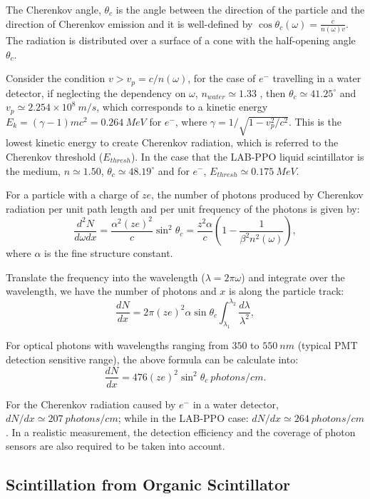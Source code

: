 The Cherenkov angle, $\theta_c$ is the angle between the direction of the particle and the direction of Cherenkov emission and it is well-defined by $\cos\theta_c(\omega) = \frac{c}{n(\omega)v}$. The radiation is distributed over a surface of a cone with the half-opening angle $\theta_c$. 

Consider the condition $v>v_p=c/n(\omega)$, for the case of $e^-$ travelling in a water detector, if neglecting the dependency on $\omega$, $n_{water}\simeq 1.33$ \cite{pdg2018}, then $\theta_c\simeq 41.25^\circ$ and $v_p\simeq 2.254\times10^8~m/s$, which corresponds to a kinetic energy $E_k=(\gamma-1)mc^2=0.264~MeV$ for $e^-$, where $\gamma=1/\sqrt{1-v_p^2/c^2}$. This is the lowest kinetic energy to create Cherenkov radiation, which is referred to the Cherenkov threshold ($E_{thresh}$). In the case that the LAB-PPO liquid scintillator is the medium, $n\simeq 1.50$\cite{tseung2011ellipsometric}, $\theta_c\simeq 48.19^\circ$ and for $e^-$, $E_{thresh}\simeq 0.175~MeV$.   

For a particle with a charge of $ze$, the number of photons produced by Cherenkov radiation per unit path length and per unit frequency of the photons is given by\cite{leo2012techniques}:
\[
\frac{d^2N}{d\omega dx}=\frac{\alpha^2 (ze)^2}{c}\sin^2\theta_c=\frac{z^2\alpha}{c}(1-\frac{1}{\beta^2 n^2(\omega)}),
\]
where $\alpha$ is the fine structure constant.

Translate the frequency into the wavelength ($\lambda=2\pi\omega$) and integrate over the wavelength, we have the number of photons and $x$ is along the particle track\cite{leo2012techniques}:
\[
\frac{dN}{dx}=2\pi (ze)^2\alpha\sin\theta_c\int_{\lambda_1}^{\lambda_2}\frac{d\lambda}{\lambda^2},
\]

For optical photons with wavelengths ranging from $350$ to $550~nm$ (typical PMT detection sensitive range), the above formula can be calculate into\cite{leo2012techniques}:
\[
\frac{dN}{dx}=476(ze)^2\sin^2\theta_c~photons/cm.
\]

For the Cherenkov radiation caused by $e^-$ in a water detector, $dN/dx \simeq 207~photons/cm$; while in the LAB-PPO case: $dN/dx \simeq 264~photons/cm$. In a realistic measurement, the detection efficiency and the coverage of photon sensors are also required to be taken into account.

\subsection{Scintillation from Organic Scintillator}

